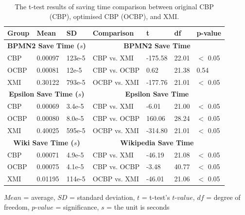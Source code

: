\documentclass{llncs}
\begin{document}
 \vspace{-25pt}
  \begin{table}[ht]
     \footnotesize
     \centering
     \caption{The t-test results of saving time comparison between original CBP (CBP), optimised CBP (OCBP), and XMI.}
     \label{table:ttest_results_savetime}
     \begin{tabular}
         {|p{}p{}p{}|p{}p{}p{}p{}|}
         \hline 
         
         Group & Mean & SD & Comparison & t  & df & p-value \\
         \hline 
         \multicolumn{3}{|c|}{\textbf{BPMN2 Save Time ($s$)}} & \multicolumn{4}{c|}{\textbf{BPMN2 Save Time}}\\
         CBP & 0.00097    & 123e-5 & CBP vs. XMI &  -175.58    & 22.01 & $<$ 0.05 \\  
         OCBP & 0.00081   & 12e-5 & CBP vs. OCBP & 0.62 & 21.38  & 0.54 \\  
         XMI & 0.30122   & 793e-5 & OCBP vs. XMI & -177.76    & 21.01  & $<$ 0.05 \\ 
         \hline 
         
         \multicolumn{3}{|c|}{\textbf{Epsilon Save Time ($s$)}} & \multicolumn{4}{c|}{\textbf{Epsilon Save Time}}\\
         CBP & 0.00069    & 3.4e-5 &  CBP vs. XMI & -6.01   &21.00 & $<$ 0.05 \\
         OCBP & 0.00080   & 8.0e-5 & CBP vs. OCBP & 160.06 & 28.24 & $<$ 0.05 \\  
         XMI & 0.40025   & 595e-5 & OCBP vs. XMI & -314.80  & 21.01  & $<$ 0.05 \\ 
         \hline 
         
         \multicolumn{3}{|c|}{\textbf{Wiki Save Time ($s$)}} & \multicolumn{4}{c|}{\textbf{Wikipedia Save Time}}\\
         CBP & 0.00071     & 4.9e-5 & CBP vs. XMI &  -46.19   & 21.08 & $<$ 0.05 \\ 
         OCBP &0.00075   &  4.1e-5 & CBP vs. OCBP &   -3.48 & 40.77 & $<$ 0.05 \\ 
         XMI &  0.01195   & 114e-5 & OCBP vs. XMI &  -46.01  & 21.06 & $<$ 0.05 \\ 
         \hline
     \end{tabular}
     \justify
     $Mean$ = average, $SD$ = standard deviation, $t$ = t-test's $t$-$value$, $df$ = degree of freedom, $p$-$value$ = significance, $s$ = the unit is seconds
 \end{table}
  
\end{document}

